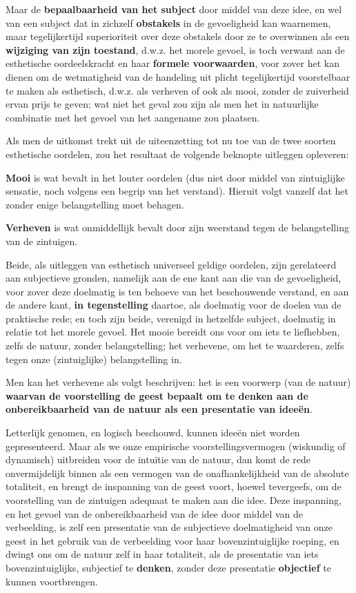 Maar de \textbf{bepaalbaarheid van het subject} door middel van deze idee, en wel van een subject dat in zichzelf \textbf{obstakels} in de gevoeligheid kan waarnemen, maar tegelijkertijd superioriteit over deze obstakels door ze te overwinnen als een \textbf{wijziging van zijn toestand}, d.w.z. het morele gevoel, is toch verwant aan de esthetische oordeelskracht en haar \textbf{formele voorwaarden}, voor zover het kan dienen om de wetmatigheid van de handeling uit plicht tegelijkertijd voorstelbaar te maken als esthetisch, d.w.z. als verheven of ook als mooi, zonder de zuiverheid ervan prijs te geven; wat niet het geval zou zijn als men het in natuurlijke combinatie met het gevoel van het aangename zou plaatsen.

Als men de uitkomst trekt uit de uiteenzetting tot nu toe van de twee soorten esthetische oordelen, zou het resultaat de volgende beknopte uitleggen opleveren:

\textbf{Mooi} is wat bevalt in het louter oordelen (dus niet door middel van zintuiglijke sensatie, noch volgens een begrip van het verstand).
Hieruit volgt vanzelf dat het zonder enige belangstelling moet behagen.

\textbf{Verheven} is wat onmiddellijk bevalt door zijn weerstand tegen de belangstelling van de zintuigen.

Beide, als uitleggen van esthetisch universeel geldige oordelen, zijn gerelateerd aan subjectieve gronden, namelijk aan de ene kant aan die van de gevoeligheid, voor zover deze doelmatig is ten behoeve van het beschouwende verstand, en aan de andere kant, \textbf{in tegenstelling} daartoe, als doelmatig voor de doelen van de praktische rede; en toch zijn beide, verenigd in hetzelfde subject, doelmatig in relatie tot het morele gevoel. Het mooie bereidt ons voor om iets te liefhebben, zelfs de natuur, zonder belangstelling; het verhevene, om het te waarderen, zelfs tegen onze (zintuiglijke) belangstelling in.

Men kan het verhevene als volgt beschrijven: het is een voorwerp (van de natuur) \textbf{waarvan de voorstelling de geest bepaalt om te denken aan de onbereikbaarheid van de natuur als een presentatie van ideeën}.

Letterlijk genomen, en logisch beschouwd, kunnen ideeën niet worden gepresenteerd. Maar als we onze empirische voorstellingsvermogen (wiskundig of dynamisch) uitbreiden voor de intuïtie van de natuur, dan komt de rede onvermijdelijk binnen als een vermogen van de onafhankelijkheid van de absolute totaliteit, en brengt de inspanning van de geest voort, hoewel tevergeefs, om de voorstelling van de zintuigen adequaat te maken aan die idee. Deze inspanning, en het gevoel van de onbereikbaarheid van de idee door middel van de verbeelding, is zelf een presentatie van de subjectieve doelmatigheid van onze geest in het gebruik van de verbeelding voor haar bovenzintuiglijke roeping, en dwingt ons om de natuur zelf in haar totaliteit, als de presentatie van iets bovenzintuiglijks, subjectief te \textbf{denken}, zonder deze presentatie \textbf{objectief} te kunnen voortbrengen.

